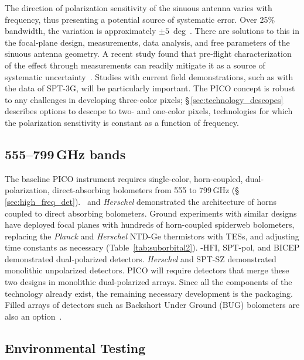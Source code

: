 

The direction of polarization sensitivity of the sinuous antenna varies with frequency, thus presenting a potential source of systematic error. Over 25\% bandwidth, the variation is approximately $\pm 5$~deg~\citep{obrient2008b}. There are solutions to this in the focal-plane design, measurements, data analysis, and free parameters of the sinuous antenna geometry.  A recent study found that pre-flight characterization of the effect through measurements can readily mitigate it as a source of systematic uncertainty~\citep{picoweb_wobble}. Studies with current field demonstrations, such as with the data of SPT-3G, will be particularly important. The PICO concept is robust to any challenges in developing three-color pixels; \S\,\ref{sec:technology_descopes} describes options to descope to two- and one-color pixels, technologies for which the polarization sensitivity is constant as a function of frequency.

\medskip
\subsection{555--799\,GHz bands}
\label{sec:dev_arrays}

The baseline PICO instrument requires single-color, horn-coupled, dual-polarization, direct-absorbing bolometers from 555 to 799\,GHz (\S\,\ref{sec:high_freq_det}).  \planck\ and \textit{Herschel} demonstrated the architecture of horns coupled to direct absorbing bolometers. 
Ground experiments with similar designs have deployed focal planes with hundreds of horn-coupled spiderweb bolometers, replacing the \textit{Planck} and \textit{Herschel} NTD-Ge thermistors with TESs, and adjusting time constants as necessary (Table~\ref{tab:suborbital2}). \planck -HFI, SPT-pol, and BICEP demonstrated dual-polarized detectors. \textit{Herschel} and SPT-SZ demonstrated monolithic unpolarized detectors. PICO will require detectors that merge these two designs in monolithic dual-polarized arrays. Since all the components of the technology already exist, the remaining necessary development is the packaging. Filled arrays of detectors such as Backshort Under Ground (BUG) bolometers are also an option~\citep{Staguhn2006}.




\subsection{Environmental Testing}
\label{sec:env_testing}


